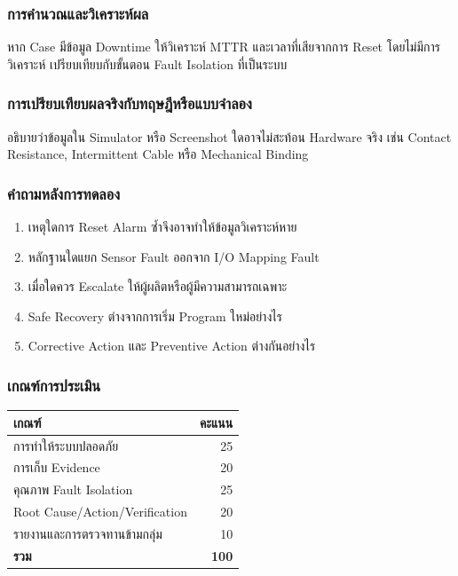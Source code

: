 \subsubsection{การคำนวณและวิเคราะห์ผล}

หาก Case มีข้อมูล Downtime ให้วิเคราะห์ MTTR และเวลาที่เสียจากการ Reset โดยไม่มีการวิเคราะห์ เปรียบเทียบกับขั้นตอน Fault Isolation ที่เป็นระบบ

\subsubsection{การเปรียบเทียบผลจริงกับทฤษฎีหรือแบบจำลอง}

อธิบายว่าข้อมูลใน Simulator หรือ Screenshot ใดอาจไม่สะท้อน Hardware จริง เช่น Contact Resistance, Intermittent Cable หรือ Mechanical Binding

\subsubsection{คำถามหลังการทดลอง}

\begin{enumerate}
    \item เหตุใดการ Reset Alarm ซ้ำจึงอาจทำให้ข้อมูลวิเคราะห์หาย
    \item หลักฐานใดแยก Sensor Fault ออกจาก I/O Mapping Fault
    \item เมื่อใดควร Escalate ให้ผู้ผลิตหรือผู้มีความสามารถเฉพาะ
    \item Safe Recovery ต่างจากการเริ่ม Program ใหม่อย่างไร
    \item Corrective Action และ Preventive Action ต่างกันอย่างไร
\end{enumerate}

\subsubsection{เกณฑ์การประเมิน}

\begin{table}[htbp]
    \centering
    \begin{tabular}{l r}
        \hline
        \textbf{เกณฑ์} & \textbf{คะแนน} \\
        \hline
        การทำให้ระบบปลอดภัย & 25 \\
        การเก็บ Evidence & 20 \\
        คุณภาพ Fault Isolation & 25 \\
        Root Cause/Action/Verification & 20 \\
        รายงานและการตรวจทานข้ามกลุ่ม & 10 \\
        \textbf{รวม} & \textbf{100} \\
        \hline
    \end{tabular}
\end{table}

